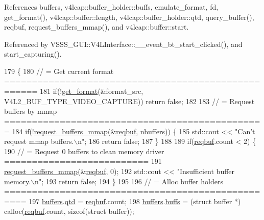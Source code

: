 References buffers, v4lcap\+::buffer\+\_\+holder\+::buffs, emulate\+\_\+format, fd, get\+\_\+format(), v4lcap\+::buffer\+::length, v4lcap\+::buffer\+\_\+holder\+::qtd, query\+\_\+buffer(), reqbuf, request\+\_\+buffers\+\_\+mmap(), and v4lcap\+::buffer\+::start.



Referenced by V\+S\+S\+S\+\_\+\+G\+U\+I\+::\+V4\+L\+Interface\+::\+\_\+\+\_\+event\+\_\+bt\+\_\+start\+\_\+clicked(), and start\+\_\+capturing().


\begin{DoxyCode}
179                                    \{
180     \textcolor{comment}{// = Get current format ====================================================}
181     \textcolor{keywordflow}{if}(!\hyperlink{classv4lcap_aa5c521438e06e14625c05a02bafd35c1}{get\_format}(&format\_src, V4L2\_BUF\_TYPE\_VIDEO\_CAPTURE)) \textcolor{keywordflow}{return} \textcolor{keyword}{false};
182 
183     \textcolor{comment}{// = Request buffers by mmap ===============================================}
184     \textcolor{keywordflow}{if}(!\hyperlink{classv4lcap_a874905b9c6c785294fa7487a844cb841}{request\_buffers\_mmap}(&\hyperlink{classv4lcap_a4b98d5a7e7859a8e234d54649ea9251e}{reqbuf}, nbuffers)) \{
185         std::cout << \textcolor{stringliteral}{"Can't request mmap buffers.\(\backslash\)n"};
186         \textcolor{keywordflow}{return} \textcolor{keyword}{false};
187     \}
188 
189     \textcolor{keywordflow}{if}(\hyperlink{classv4lcap_a4b98d5a7e7859a8e234d54649ea9251e}{reqbuf}.count < 2) \{
190         \textcolor{comment}{// = Request 0 buffers to clean memory driver ==========================}
191         \hyperlink{classv4lcap_a874905b9c6c785294fa7487a844cb841}{request\_buffers\_mmap}(&\hyperlink{classv4lcap_a4b98d5a7e7859a8e234d54649ea9251e}{reqbuf}, 0);
192         std::cout << \textcolor{stringliteral}{"Insufficient buffer memory.\(\backslash\)n"};
193         \textcolor{keywordflow}{return} \textcolor{keyword}{false};
194     \}
195 
196     \textcolor{comment}{// = Alloc buffer holders ==================================================}
197     \hyperlink{classv4lcap_a046084072d2279bb204ed93cd2692700}{buffers}.\hyperlink{structv4lcap_1_1buffer__holder_a40424b4a28263425ab1bc05aac1490b4}{qtd} = \hyperlink{classv4lcap_a4b98d5a7e7859a8e234d54649ea9251e}{reqbuf}.count;
198     \hyperlink{classv4lcap_a046084072d2279bb204ed93cd2692700}{buffers}.\hyperlink{structv4lcap_1_1buffer__holder_afa53426fad11e19f7d615f564c979495}{buffs} = (\textcolor{keyword}{struct }buffer *) calloc(\hyperlink{classv4lcap_a4b98d5a7e7859a8e234d54649ea9251e}{reqbuf}.count, \textcolor{keyword}{sizeof}(\textcolor{keyword}{struct} buffer));

\end{DoxyCode}
